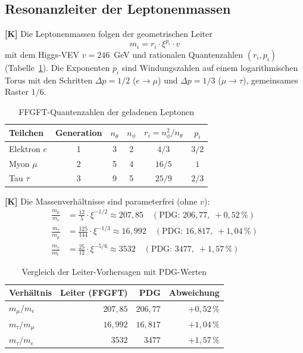 \subsection{Resonanzleiter der Leptonenmassen}

\textbf{[K]} Die Leptonenmassen folgen der geometrischen Leiter
\begin{equation}
  m_i = r_i \cdot \xi^{p_i} \cdot v
\end{equation}
mit dem Higgs-VEV $v = 246$~GeV und rationalen Quantenzahlen
$(r_i, p_i)$ (Tabelle~\ref{tab:lepton_qz}). Die Exponenten $p_i$ sind
Windungszahlen auf einem logarithmischen Torus mit den Schritten
$\Delta p = 1/2$ ($e \to \mu$) und $\Delta p = 1/3$ ($\mu \to \tau$),
gemeinsames Raster $1/6$.

\begin{table}[h]
\centering
\caption{FFGFT-Quantenzahlen der geladenen Leptonen}
\label{tab:lepton_qz}
\begin{tabular}{lccccc}
\toprule
Teilchen & Generation & $n_\theta$ & $n_\phi$ &
  $r_i = n_\phi^2/n_\theta$ & $p_i$ \\
\midrule
Elektron $e$   & 1 & 3 & 2 & $4/3$  & $3/2$ \\
Myon $\mu$     & 2 & 5 & 4 & $16/5$ & $1$   \\
Tau $\tau$     & 3 & 9 & 5 & $25/9$ & $2/3$ \\
\bottomrule
\end{tabular}
\end{table}

\textbf{[K]} Die Massenverhältnisse sind parameterfrei (ohne $v$):
\begin{align}
  \frac{m_\mu}{m_e} &= \frac{12}{5} \cdot \xi^{-1/2}
    \approx 207{,}85 \quad (\text{PDG: } 206{,}77,\; +0{,}52\,\%) \\
  \frac{m_\tau}{m_\mu} &= \frac{125}{144} \cdot \xi^{-1/3}
    \approx 16{,}992 \quad (\text{PDG: } 16{,}817,\; +1{,}04\,\%) \\
  \frac{m_\tau}{m_e} &= \frac{25}{12} \cdot \xi^{-5/6}
    \approx 3532 \quad (\text{PDG: } 3477,\; +1{,}57\,\%)
\end{align}

\begin{table}[h]
\centering
\caption{Vergleich der Leiter-Vorhersagen mit PDG-Werten}
\label{tab:massverhaeltnisse}
\begin{tabular}{lrrr}
\toprule
Verhältnis & Leiter (FFGFT) & PDG & Abweichung \\
\midrule
$m_\mu/m_e$    & $207{,}85$ & $206{,}77$ & $+0{,}52\,\%$ \\
$m_\tau/m_\mu$ & $16{,}992$ & $16{,}817$ & $+1{,}04\,\%$ \\
$m_\tau/m_e$   & $3532$     & $3477$     & $+1{,}57\,\%$ \\
\bottomrule
\end{tabular}
\end{table}

